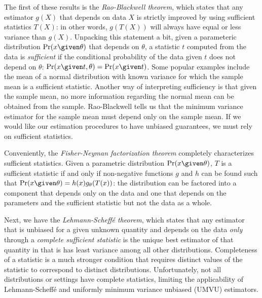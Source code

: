 The first of these results is the \textit{Rao-Blackwell theorem}, which states that any estimator $g(X)$ that depends on data $X$ is strictly improved  by using sufficient statistics $T(X)$: in other words, $g(T(X))$ will always have equal or less variance than $g(X)$.
Unpacking this statement a bit, given a parameteric  distribution $\Pr(x \given \theta)$ that depends on $\theta$, a statistic $t$  computed from the data is \textit{sufficient} if the conditional probability of the data given $t$ does not depend on $\theta$: $\Pr(x \given t, \theta) = \Pr(x \given t)$.
Some popular examples include the mean of a normal distribution with known variance for which the sample mean is a sufficient statistic.
Another way of interpreting sufficiency is that given the sample mean, no more information regarding the normal mean can be obtained from the sample. 
Rao-Blackwell tells us that the minimum variance estimator for the sample mean  must depend only on the sample mean.
If we would like our estimation procedures to have unbiased guarantees, we must rely on sufficient statistics.

Conveniently, the \textit{Fisher-Neyman factorization theorem} completely characterizes sufficient statistics.
Given a parametric distribution $\Pr(x \given \theta)$, $T$ is a sufficient statistic if and only if non-negative functions $g$ and $h$ can be found such that $\Pr(x \given \theta) = h(x) g_\theta(T(x))$:
  the distribution can be factored into a component that depends only on the data and one that depends on the parameters and the sufficient statistic but not the data as a whole.

Next, we have the \textit{Lehmann-Scheff\'{e} theorem}, which states that any estimator that is unbiased for a given unknown quantity and depends on the data \textit{only} through a \textit{complete sufficient statistic} is the unique best estimator of that quantity in that is has least variance among all other distributions.
Completeness of a statistic is a much stronger condition that requires distinct values of the statistic to correspond to distinct distributions.
Unfortunately, not all distributions or settings have complete statistics, limiting the applicability of Lehmann-Scheff\'{e} and uniformly minimum variance unbiased (UMVU) estimators.


